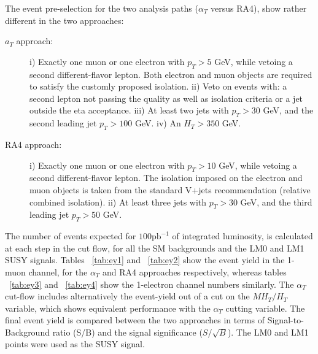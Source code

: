 The event pre-selection for the two analysis paths ($\alpha_{T}$ versus RA4), show rather different in the two approaches:
\begin{description}
\item[$a_{T}$ approach:] i) Exactly one muon or one electron with $p_{T}>5$ GeV, while vetoing a second different-flavor lepton. Both electron and muon objects are required to satisfy the customly proposed isolation. ii) Veto on events with: a second lepton not passing the quality as well as isolation criteria or a jet outside the eta acceptance. iii) At least two jets with $p_{T}>30$ GeV, and the second leading jet $p_{T} > 100$ GeV. iv) An $H_{T} > 350$ GeV. 
\item[RA4 approach:] i) Exactly one muon or one electron with $p_{T}>10$ GeV, while vetoing a second different-flavor lepton. The isolation imposed on the electron and muon objects is taken from the standard V+jets recommendation (relative combined isolation). ii) At least three jets with $p_{T}>30$ GeV, and the third leading jet $p_{T}>50$ GeV. 
\end{description}

The number of events expected for $100 \textrm{pb}^{-1}$ of integrated luminosity, is calculated at each step in the cut flow, for all the SM backgrounds and the LM0 and LM1 SUSY signals. Tables ~\ref{tab:ey1} and ~\ref{tab:ey2} show the event yield in the 1-muon channel, for the $\alpha_{T}$ and RA4 approaches respectively, whereas tables ~\ref{tab:ey3} and ~\ref{tab:ey4} show the 1-electron channel numbers similarly. The $\alpha_{T}$ cut-flow includes alternatively the event-yield out of a cut on the $MH_{T}/H_{T}$ variable, which shows equivalent performance with the $\alpha_{T}$ cutting variable. The final event yield is compared between the two approaches in terms of Signal-to-Background ratio (S/B) and the signal significance ($S/\sqrt{B}$). The LM0 and LM1 points were used as the SUSY signal.

